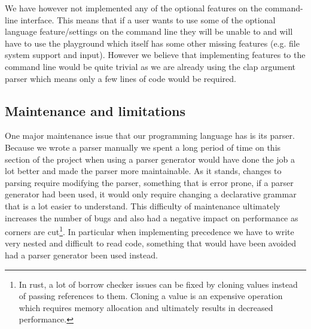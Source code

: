 \documentclass{article}
\begin{document}
We have however not implemented any of the optional features on the
command-line interface. This means that if a user wants to use some of the
optional language feature/settings on the command line they will be unable to
and will have to use the playground which itself has some other missing
features (e.g. file system support and input). However we believe that
implementing features to the command line would be quite trivial as we are
already using the clap argument parser which means only a few lines of code
would be required.

\subsection{Maintenance and limitations}

One major maintenance issue that our programming language has is its parser.
Because we wrote a parser manually we spent a long period of time on this
section of the project when using a parser generator would have done the job a
lot better and made the parser more maintainable. As it stands, changes to
parsing require modifying the parser, something that is error prone, if a
parser generator had been used, it would only require changing a declarative
grammar that is a lot easier to understand. This difficulty of maintenance
ultimately increases the number of bugs and also had a negative impact on
performance as corners are cut\footnote{In rust, a lot of borrow checker issues
can be fixed by cloning values instead of passing references to them. Cloning a
value is an expensive operation which requires memory allocation and ultimately
results in decreased performance.}. In particular when implementing
precedence we have to write very nested and difficult to read code, something
that would have been avoided had a parser generator been used instead.
\end{document}
